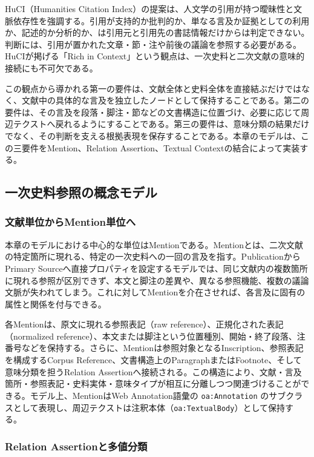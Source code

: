 HuCI（Humanities Citation Index）の提案は、人文学の引用が持つ曖昧性と文脈依存性を強調する。引用が支持的か批判的か、単なる言及か証拠としての利用か、記述的か分析的か、は引用元と引用先の書誌情報だけからは判定できない。判断には、引用が置かれた文章・節・注や前後の議論を参照する必要がある。HuCIが掲げる「Rich in Context」という観点は、一次史料と二次文献の意味的接続にも不可欠である。

この観点から導かれる第一の要件は、文献全体と史料全体を直接結ぶだけではなく、文献中の具体的な言及を独立したノードとして保持することである。第二の要件は、その言及を段落・脚注・節などの文書構造に位置づけ、必要に応じて周辺テクストへ戻れるようにすることである。第三の要件は、意味分類の結果だけでなく、その判断を支える根拠表現を保存することである。本章のモデルは、この三要件をMention、Relation Assertion、Textual Contextの結合によって実装する。

\subsection{一次史料参照の概念モデル}

\subsubsection{文献単位からMention単位へ}

本章のモデルにおける中心的な単位はMentionである。Mentionとは、二次文献の特定箇所に現れる、特定の一次史料への一回の言及を指す。Publicationから Primary Sourceへ直接プロパティを設定するモデルでは、同じ文献内の複数箇所に現れる参照が区別できず、本文と脚注の差異や、異なる参照機能、複数の議論文脈が失われてしまう。これに対してMentionを介在させれば、各言及に固有の属性と関係を付与できる。

各Mentionは、原文に現れる参照表記（raw reference）、正規化された表記（normalized reference）、本文または脚注という位置種別、開始・終了段落、注番号などを保持する。さらに、Mentionは参照対象となるInscription、参照表記を構成するCorpus Reference、文書構造上のParagraphまたはFootnote、そして意味分類を担うRelation Assertionへ接続される。この構造により、文献・言及箇所・参照表記・史料実体・意味タイプが相互に分離しつつ関連づけることができる。モデル上、MentionはWeb Annotation語彙の \texttt{oa:Annotation} のサブクラスとして表現し、周辺テクストは注釈本体（\texttt{oa:TextualBody}）として保持する。

\subsubsection{Relation Assertionと多値分類}

